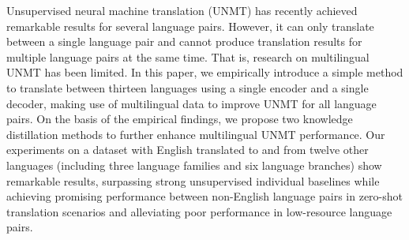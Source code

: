 Unsupervised neural machine translation (UNMT) has recently achieved remarkable results for several language pairs. However, it can only translate between a single language pair and cannot produce translation results for multiple language pairs at the same time. That is, research on multilingual UNMT has been limited. In this paper, we empirically introduce a simple method to translate between thirteen languages using a single encoder and a single decoder, making use of multilingual data to improve UNMT for all language pairs. On the basis of the empirical findings, we propose two knowledge distillation methods to further enhance multilingual UNMT performance. Our experiments on a dataset with English translated to and from twelve other languages (including three language families and six language branches) show remarkable results, surpassing strong unsupervised individual baselines while achieving promising performance between non-English language pairs in zero-shot translation scenarios and alleviating poor performance in low-resource language pairs.
